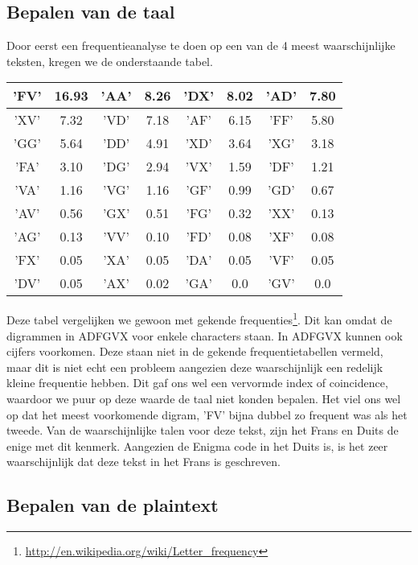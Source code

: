 \subsection{Bepalen van de taal}
Door eerst een frequentieanalyse te doen op een van de 4 meest waarschijnlijke teksten, kregen we de onderstaande tabel.
\begin{center}
\begin{tabular}{|c|c|c|c|c|c|c|c|}
\hline
'FV'& 16.93 &
'AA'& 8.26 &
'DX'& 8.02 &
'AD'& 7.80\\ \hline
'XV'& 7.32 &
'VD'& 7.18 &
'AF'& 6.15 &
'FF'& 5.80\\ \hline
'GG'& 5.64 &
'DD'& 4.91 &
'XD'& 3.64 &
'XG'& 3.18\\ \hline
'FA'& 3.10 &
'DG'& 2.94 &
'VX'& 1.59 &
'DF'& 1.21\\ \hline
'VA'& 1.16 &
'VG'& 1.16 &
'GF'& 0.99 &
'GD'& 0.67\\ \hline
'AV'& 0.56 &
'GX'& 0.51 &
'FG'& 0.32 &
'XX'& 0.13\\ \hline
'AG'& 0.13 &
'VV'& 0.10 &
'FD'& 0.08 &
'XF'& 0.08\\ \hline
'FX'& 0.05 &
'XA'& 0.05 &
'DA'& 0.05 &
'VF'& 0.05\\ \hline
'DV'& 0.05 &
'AX'& 0.02 &
'GA'& 0.0 &
'GV'& 0.0\\ \hline
\end{tabular}

\end{center}

Deze tabel vergelijken we gewoon met gekende frequenties\footnote{\url{http://en.wikipedia.org/wiki/Letter_frequency}}. Dit kan omdat de digrammen in ADFGVX voor enkele characters staan. In ADFGVX kunnen ook cijfers voorkomen. Deze staan niet in de gekende frequentietabellen vermeld, maar dit is niet echt een probleem aangezien deze waarschijnlijk een redelijk kleine frequentie hebben. Dit gaf ons wel een vervormde index of coincidence, waardoor we puur op deze waarde de taal niet konden bepalen. Het viel ons wel op dat het meest voorkomende digram, 'FV' bijna dubbel zo frequent was als het tweede. Van de waarschijnlijke talen voor deze tekst, zijn het Frans en Duits de enige met dit kenmerk. Aangezien de Enigma code in het Duits is, is het zeer waarschijnlijk dat deze tekst in het Frans is geschreven.

\subsection{Bepalen van de plaintext}

